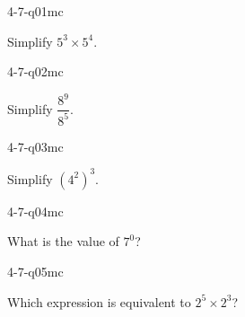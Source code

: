 

\begin{practiceQuestion}{4-7-q01}{mc}
\begin{questionText}
Simplify $5^3 \times 5^4$.
\end{questionText}
\end{practiceQuestion}

\begin{practiceQuestion}{4-7-q02}{mc}
\begin{questionText}
Simplify $\dfrac{8^9}{8^5}$.
\end{questionText}
\end{practiceQuestion}

\begin{practiceQuestion}{4-7-q03}{mc}
\begin{questionText}
Simplify $(4^2)^3$.
\end{questionText}
\end{practiceQuestion}

\begin{practiceQuestion}{4-7-q04}{mc}
\begin{questionText}
What is the value of $7^0$?
\end{questionText}
\end{practiceQuestion}

\begin{practiceQuestion}{4-7-q05}{mc}
\begin{questionText}
Which expression is equivalent to $2^5 \times 2^3$?
\end{questionText}
\end{practiceQuestion}

